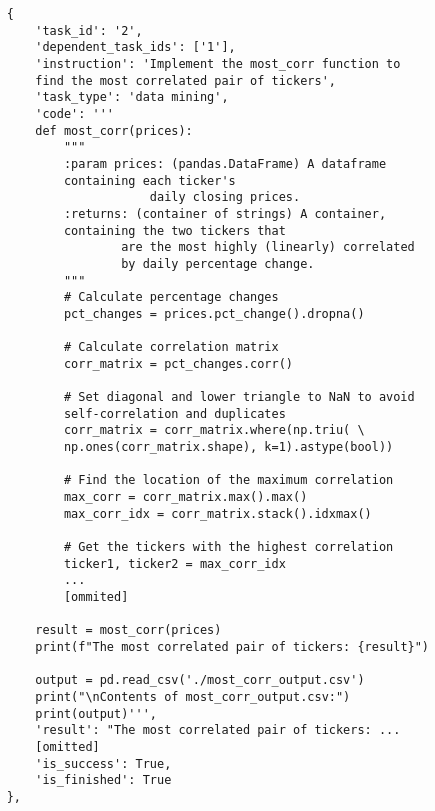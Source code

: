\onecolumn
\vspace{-1cm}
\begin{tcolorbox}[colback=blue!5!white, colframe=blue!75!black, title=Successful case \#3 from Claude-3-5-sonnet-20240620, text width=\textwidth]
\begin{verbatim}
    {
        'task_id': '2',
        'dependent_task_ids': ['1'],
        'instruction': 'Implement the most_corr function to 
        find the most correlated pair of tickers',
        'task_type': 'data mining',
        'code': '''
        def most_corr(prices):
            """
            :param prices: (pandas.DataFrame) A dataframe 
            containing each ticker's 
                        daily closing prices.
            :returns: (container of strings) A container, 
            containing the two tickers that 
                    are the most highly (linearly) correlated 
                    by daily percentage change.
            """
            # Calculate percentage changes
            pct_changes = prices.pct_change().dropna()
            
            # Calculate correlation matrix
            corr_matrix = pct_changes.corr()
            
            # Set diagonal and lower triangle to NaN to avoid 
            self-correlation and duplicates
            corr_matrix = corr_matrix.where(np.triu( \
            np.ones(corr_matrix.shape), k=1).astype(bool))
            
            # Find the location of the maximum correlation
            max_corr = corr_matrix.max().max()
            max_corr_idx = corr_matrix.stack().idxmax()
            
            # Get the tickers with the highest correlation
            ticker1, ticker2 = max_corr_idx
            ...
            [ommited]

        result = most_corr(prices)
        print(f"The most correlated pair of tickers: {result}")

        output = pd.read_csv('./most_corr_output.csv')
        print("\nContents of most_corr_output.csv:")
        print(output)''',
        'result': "The most correlated pair of tickers: ...
        [omitted]
        'is_success': True,
        'is_finished': True
    },
\end{verbatim}
\end{tcolorbox}
\twocolumn